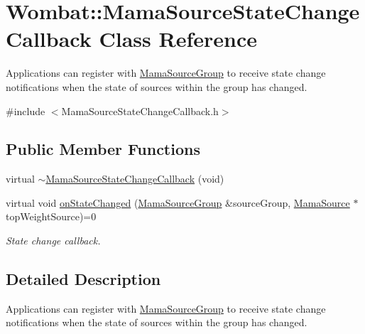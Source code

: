 \hypertarget{classWombat_1_1MamaSourceStateChangeCallback}{
\section{Wombat::MamaSourceStateChangeCallback Class Reference}
\label{classWombat_1_1MamaSourceStateChangeCallback}
}


Applications can register with \hyperlink{classWombat_1_1MamaSourceGroup}{MamaSourceGroup} to receive state change notifications when the state of sources within the group has changed.  


{\ttfamily \#include $<$MamaSourceStateChangeCallback.h$>$}\subsection*{Public Member Functions}
\begin{DoxyCompactItemize}
\item 
virtual \hyperlink{classWombat_1_1MamaSourceStateChangeCallback_a47631526146f256086453731e24306c0}{$\sim$MamaSourceStateChangeCallback} (void)
\item 
virtual void \hyperlink{classWombat_1_1MamaSourceStateChangeCallback_aebc13e83b3de1072ef12a6083bc5061b}{onStateChanged} (\hyperlink{classWombat_1_1MamaSourceGroup}{MamaSourceGroup} \&sourceGroup, \hyperlink{classWombat_1_1MamaSource}{MamaSource} $\ast$topWeightSource)=0
\begin{DoxyCompactList}\small\item\em State change callback. \item\end{DoxyCompactList}\end{DoxyCompactItemize}


\subsection{Detailed Description}
Applications can register with \hyperlink{classWombat_1_1MamaSourceGroup}{MamaSourceGroup} to receive state change notifications when the state of sources within the group has changed. 

